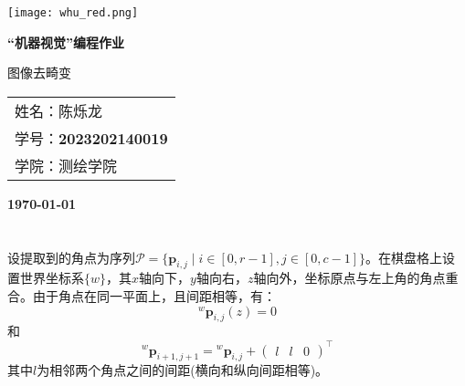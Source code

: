 \documentclass[12pt, onecolumn]{article}
\title{\normf{编程：观测值逐次更新的扩展卡尔曼滤波器}}
\author{\normf 姓名：陈烁龙\;\;\;学号：2023202140019\;\;\;学院：测绘学院}
\date{\normf{\today}}
\newcommand\normf{\fangsong}
\begin{document}
	\begin{titlepage}
	    \centering
	    \texttt{[image: whu\_red.png]}\par\vspace{1cm}
	    \vspace{4cm}
	    {\huge\kaishu\bfseries “机器视觉”编程作业\par 图像去畸变 \par}
	    \vspace{3cm}
	    {\Large\kaishu 
	    \begin{center}\begin{tabular}{l}
	    姓名：陈烁龙\\
	    学号：\bfseries 2023202140019\\
	    学院：测绘学院
	    \end{tabular}\end{center}
	     \par}
	    
	
	    \vfill
	
	    {\large\kaishu\bfseries \today\par}
	\end{titlepage}
 		\thispagestyle{empty}
		\clearpage
		
		\tableofcontents
		\newpage
		\listoffigures
		
		\clearpage
		\setcounter{page}{1}
	
	
	\section{\normf{针孔相机模型}}
	\normf\bfseries
	
	设提取到的角点为序列$\mathcal{P}=\{\boldsymbol{p}_{i,j}\mid i\in[0,r-1],j\in[0,c-1]\}$。在棋盘格上设置世界坐标系$\{w\}$，其$x$轴向下，$y$轴向右，$z$轴向外，坐标原点与左上角的角点重合。由于角点在同一平面上，且间距相等，有：
	\begin{equation}
	{^w\boldsymbol{p}_{i,j}}(z)=0
	\end{equation}
	和
	\begin{equation}
	{^w\boldsymbol{p}_{i+1,j+1}}={^w\boldsymbol{p}_{i,j}}+\begin{pmatrix}
	l&l&0
	\end{pmatrix}^\top
	\end{equation}
	其中$l$为相邻两个角点之间的间距(横向和纵向间距相等)。
	
\end{document}
